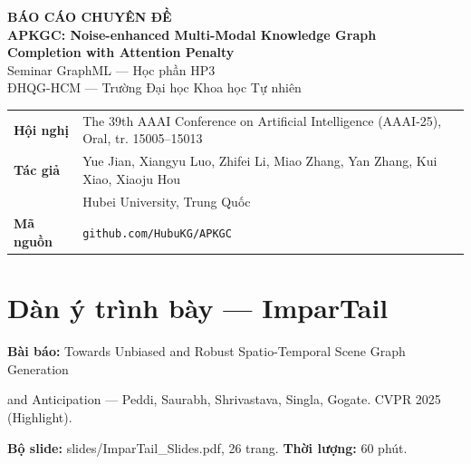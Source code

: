 \documentclass[11pt,a4paper]{article}
\newcommand{\code}[1]{{\ttfamily\small\color{codetext}#1}}
\begin{document}
\begin{center}
  {\sffamily\LARGE\bfseries\color{hcmusblue} BÁO CÁO CHUYÊN ĐỀ}\\[8pt]
  {\sffamily\large\bfseries APKGC: Noise-enhanced Multi-Modal Knowledge Graph\\
   Completion with Attention Penalty}\\[10pt]
  {\small Seminar GraphML --- Học phần HP3}\\[2pt]
  {\small ĐHQG-HCM --- Trường Đại học Khoa học Tự nhiên}
\end{center}

\vspace{4pt}
\begin{center}\small
\begin{tabular}{@{}ll@{}}
  \toprule
  \textbf{Hội nghị} & The 39th AAAI Conference on Artificial Intelligence
                      (AAAI-25), Oral, tr. 15005--15013\\
  \textbf{Tác giả}  & Yue Jian, Xiangyu Luo, Zhifei Li, Miao Zhang, Yan Zhang,
                      Kui Xiao, Xiaoju Hou\\
                    & Hubei University, Trung Quốc\\
  \textbf{Mã nguồn} & \texttt{github.com/HubuKG/APKGC}\\
  \bottomrule
\end{tabular}
\end{center}

\vspace{6pt}
\section{Dàn ý trình bày --- ImparTail}
\textbf{Bài báo:} Towards Unbiased and Robust Spatio-Temporal Scene Graph Generation

and Anticipation --- Peddi, Saurabh, Shrivastava, Singla, Gogate. CVPR 2025 (Highlight).

\textbf{Bộ slide:} \code{slides/ImparTail\_Slides.pdf}, 26 trang. \textbf{Thời lượng:} 60 phút.
\end{document}
